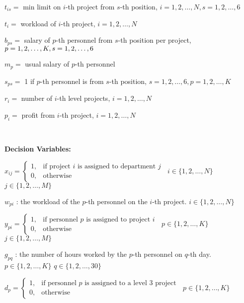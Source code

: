 \documentclass[11pt]{article}
\begin{document}
{\begin{mdframed}[style=MyFrame]
\begin{fleqn}
$t_{is} =$ min limit on $i$-th project from $s$-th position, $i=1,2,\dots,N, s=1,2,\dots,6$

$t_i =$ workload of $i$-th project, $i=1,2,\dots,N$

$b_{ps} =$ salary of $p$-th personnel from $s$-th position per project, $p=1,2,\dots,K, \\ s=1,2,\dots,6$

$m_p =$ usual salary of $p$-th personnel

$s_{ps} =$ 1 if $p$-th personnel is from $s$-th position, $s=1,2,\dots,6, p=1,2,\dots,K$

$r_i =$ number of $i$-th level projects, $i=1,2,\dots,N$

$p_i =$ profit from $i$-th project, $i=1,2,\dots,N$ 
\end{fleqn}

\





\end{mdframed}

{\begin{mdframed}[style=MyFrame]
{\textbf{Decision Variables:}}  
\begin{fleqn}
        
$x_{ij} = \begin{cases} 1, &\text{if project $i$ is assigned to department  $j$}\ \\ 0, &\text{otherwise} \end{cases}$ $i \in \{1, 2, \dots, N\}$
$j \in \{1, 2, \dots, M\}$

$w_{pi}$ :  the workload of the $p$-th personnel on the $i$-th project. $i \in \{1, 2, \dots, N\}$
        
$y_{pi} = \begin{cases} 1, &\text{if personnel $p$ is assigned to project $i$}\ \\ 0, &\text{otherwise} \end{cases}$ $p \in \{1, 2, \dots, K\}$ $j \in \{1, 2, \dots, M\}$
        
$g_{pq}$ : the number of hours worked by the $p$-th personnel on $q$-th day.\\$p \in \{1, 2, \dots, K\}$ $q \in\{1,2,\dots, 30\}$
        
$d_p = \begin{cases} 1, &\text{if personnel $p$ is assigned to a level 3 project}\ \\ 0, &\text{otherwise} \end{cases}$ $p \in \{1, 2, \dots, K\}$
        

\end{fleqn}
\end{mdframed}}}
\end{document}
